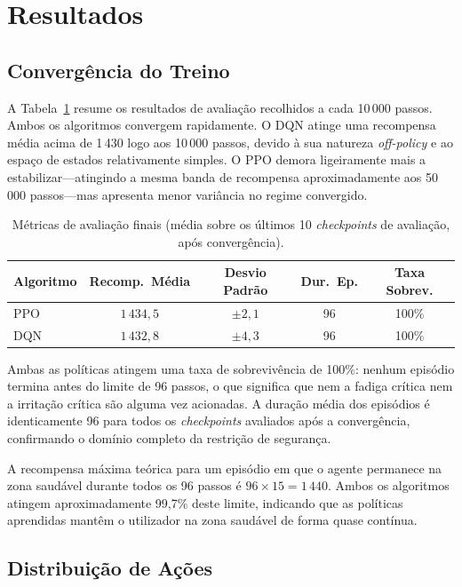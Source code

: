 \documentclass[runningheads]{llncs}
\begin{document}
%
\section{Resultados}
\label{sec:results}

\subsection{Convergência do Treino}

A Tabela~\ref{tab:results} resume os resultados de avaliação recolhidos a cada
10\,000 passos. Ambos os algoritmos convergem rapidamente. O DQN atinge uma
recompensa média acima de 1\,430 logo aos 10\,000 passos, devido à sua natureza
\emph{off-policy} e ao espaço de estados relativamente simples. O PPO demora
ligeiramente mais a estabilizar---atingindo a mesma banda de recompensa
aproximadamente aos 50\,000 passos---mas apresenta menor variância no regime
convergido.

\begin{table}[h]
\caption{Métricas de avaliação finais (média sobre os últimos 10
\emph{checkpoints} de avaliação, após convergência).}
\label{tab:results}
\centering
\begin{tabular}{lcccc}
\toprule
Algoritmo & Recomp.\ Média & Desvio Padrão & Dur.\ Ep. & Taxa Sobrev. \\
\midrule
PPO & $1\,434{,}5$ & $\pm 2{,}1$ & 96 & 100\% \\
DQN & $1\,432{,}8$ & $\pm 4{,}3$ & 96 & 100\% \\
\bottomrule
\end{tabular}
\end{table}

Ambas as políticas atingem uma taxa de sobrevivência de 100\%: nenhum episódio
termina antes do limite de 96 passos, o que significa que nem a fadiga crítica
nem a irritação crítica são alguma vez acionadas. A duração média dos episódios é
identicamente 96 para todos os \emph{checkpoints} avaliados após a convergência,
confirmando o domínio completo da restrição de segurança.

A recompensa máxima teórica para um episódio em que o agente permanece na zona
saudável durante todos os 96 passos é $96 \times 15 = 1\,440$. Ambos os algoritmos
atingem aproximadamente 99,7\% deste limite, indicando que as políticas aprendidas
mantêm o utilizador na zona saudável de forma quase contínua.

\subsection{Distribuição de Ações}
\end{document}
